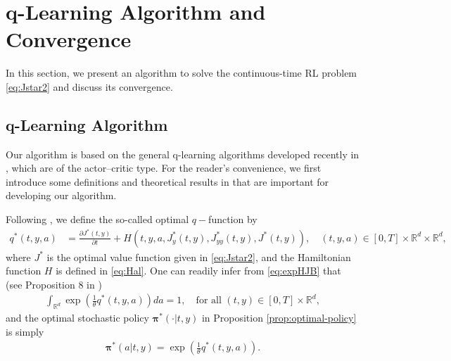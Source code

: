 \documentclass[11pt]{article}
\newcommand{\bpi}{\boldsymbol{\pi}}
\begin{document}
\section{q-Learning Algorithm and Convergence}\label{sec:algorithm}
In this section, we present an algorithm to solve the continuous-time RL problem \eqref{eq:Jstar2} and discuss its convergence.

\subsection{q-Learning Algorithm}
 Our algorithm is based on the general q-learning algorithms developed recently in \cite{jia2023q}, which are of the actor--critic type. For the reader's convenience, we first introduce some definitions and theoretical results in \cite{jia2023q} that are important for developing our algorithm.

Following \cite{jia2023q}, we define the so-called optimal $q-$function by
\begin{align*} %
	q^*(t, y, a) & =
	\frac{\partial J^*(t, y)  }{\partial t } +   H(t, y, a, J^*_y(t, y),  J^*_{yy}(t, y), J^*(t, y)), \quad (t,y,a) \in [0, T] \times \mathbb{R}^d \times \mathbb{R}^d,
\end{align*}
where $J^*$ is the optimal value function given in \eqref{eq:Jstar2}, and the Hamiltonian function $H$ is defined in \eqref{eq:Hal}. One can readily infer from \eqref{eq:expHJB} that (see Proposition 8 in \citealp{jia2023q})
\begin{align*}
 \int_{\mathbb{R}^d } {\exp \left( \frac{1}{\theta}  q^*(t,y,a) \right) da} = 1, \quad \text{for all $(t,y) \in [0, T] \times \mathbb{R}^d $},
\end{align*}
and  the  optimal stochastic policy $\bpi^* (\cdot| t, y)$ in Proposition \ref{prop:optimal-policy} is simply
\begin{align*}
\bpi^* (a| t, y) = \exp \left( \frac{1}{\theta}  q^*(t, y,a) \right).
\end{align*}
\end{document}
